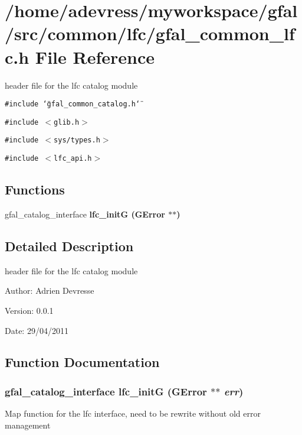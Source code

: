 \section{/home/adevress/myworkspace/gfal/src/common/lfc/gfal\_\-common\_\-lfc.h File Reference}
\label{gfal__common__lfc_8h}
header file for the lfc catalog module 

{\tt \#include \char`\"{}gfal\_\-common\_\-catalog.h\char`\"{}}\par
{\tt \#include $<$glib.h$>$}\par
{\tt \#include $<$sys/types.h$>$}\par
{\tt \#include $<$lfc\_\-api.h$>$}\par
\subsection*{Functions}
\begin{CompactItemize}
\item 
gfal\_\-catalog\_\-interface \bf{lfc\_\-init\-G} (GError $\ast$$\ast$)
\end{CompactItemize}


\subsection{Detailed Description}
header file for the lfc catalog module 

\begin{Desc}
\item[Author:]Adrien Devresse \end{Desc}
\begin{Desc}
\item[Version:]0.0.1 \end{Desc}
\begin{Desc}
\item[Date:]29/04/2011 \end{Desc}


\subsection{Function Documentation}
\subsubsection{\setlength{\rightskip}{0pt plus 5cm}gfal\_\-catalog\_\-interface lfc\_\-init\-G (GError $\ast$$\ast$ {\em err})}\label{gfal__common__lfc_8h_f005cde707ebb1395b0cb90b55f4588c}


Map function for the lfc interface, need to be rewrite without old error management 